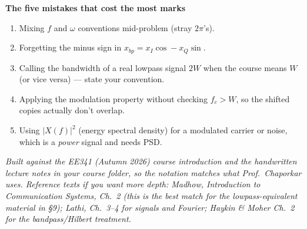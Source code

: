 \documentclass[11pt,a4paper]{article}
\begin{document}
\vspace{1em}
\begin{trapbox}
\textbf{The five mistakes that cost the most marks}
\begin{enumerate}[nosep,leftmargin=*]
\item Mixing $f$ and $\omega$ conventions mid-problem (stray $2\pi$'s).
\item Forgetting the minus sign in $x_{bp}=x_I\cos-x_Q\sin$.
\item Calling the bandwidth of a real lowpass signal $2W$ when the course means $W$ (or vice versa) --- state your convention.
\item Applying the modulation property without checking $f_c>W$, so the shifted copies actually don't overlap.
\item Using $|X(f)|^2$ (energy spectral density) for a modulated carrier or noise, which is a \emph{power} signal and needs PSD.
\end{enumerate}
\end{trapbox}

\vfill
\noindent\small\textit{Built against the EE341 (Autumn 2026) course introduction and the handwritten lecture
notes in your course folder, so the notation matches what Prof.\ Chaporkar uses. Reference texts if you want
more depth: Madhow, \emph{Introduction to Communication Systems}, Ch.~2 (this is the best match for the
lowpass-equivalent material in \S9); Lathi, Ch.~3--4 for signals and Fourier; Haykin \& Moher Ch.~2 for the
bandpass/Hilbert treatment.}
\end{document}
